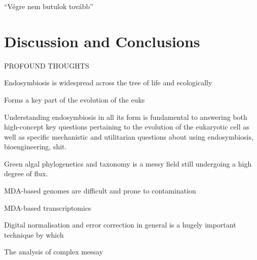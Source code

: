 \graphicspath{{chapters/7.Discussion/figures}}

\begin{savequote}[75mm]
``V\'egre nem butulok tov\'abb'' 
\end{savequote}

\chapter{Discussion and Conclusions}

PROFOUND THOUGHTS

Endosymbiosis 
is widespread across the tree of life and
ecologically

Forms a key part of the evolution of the euks


Understanding endosymbiosis in all its form is
fundamental to answering both high-concept key questions 
pertaining to the evolution
of the eukaryotic cell as well as specific mechanistic
and utilitarian questions about using
endosymbiosis, bioengineering, shit.


Green algal phylogenetics and taxonomy is a messy field still 
undergoing a high degree of flux. 

MDA-based genomes are difficult and prone to contamination 

MDA-based transcriptomics 


Digital normalisation and error correction in general is a hugely
important technique by which 




The analysis of complex messay 


